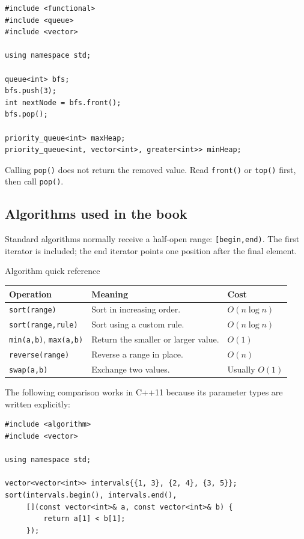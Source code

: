 \begin{lstlisting}
#include <functional>
#include <queue>
#include <vector>

using namespace std;

queue<int> bfs;
bfs.push(3);
int nextNode = bfs.front();
bfs.pop();

priority_queue<int> maxHeap;
priority_queue<int, vector<int>, greater<int>> minHeap;
\end{lstlisting}

Calling \texttt{pop()} does not return the removed value. Read \texttt{front()}
or \texttt{top()} first, then call \texttt{pop()}.

\subsection{Algorithms used in the book}

Standard algorithms normally receive a half-open range:
\texttt{[begin,end)}. The first iterator is included; the end iterator points
one position after the final element.

\begin{revisionbox}{Algorithm quick reference}
\small
\setlength{\tabcolsep}{3pt}
\begin{tabularx}{\linewidth}{@{}>{\raggedright\arraybackslash}p{3.6cm}X>{\raggedright\arraybackslash}p{2.0cm}@{}}
\toprule
Operation & Meaning & Cost \\
\midrule
\texttt{sort(range)} & Sort in increasing order. & $O(n\log n)$ \\
\texttt{sort(range,rule)} & Sort using a custom rule. & $O(n\log n)$ \\
\texttt{min(a,b)}, \texttt{max(a,b)} & Return the smaller or larger value. & $O(1)$ \\
\texttt{reverse(range)} & Reverse a range in place. & $O(n)$ \\
\texttt{swap(a,b)} & Exchange two values. & Usually $O(1)$ \\
\bottomrule
\end{tabularx}
\end{revisionbox}

The following comparison works in C++11 because its parameter types are
written explicitly:

\begin{lstlisting}
#include <algorithm>
#include <vector>

using namespace std;

vector<vector<int>> intervals{{1, 3}, {2, 4}, {3, 5}};
sort(intervals.begin(), intervals.end(),
     [](const vector<int>& a, const vector<int>& b) {
         return a[1] < b[1];
     });
\end{lstlisting}

